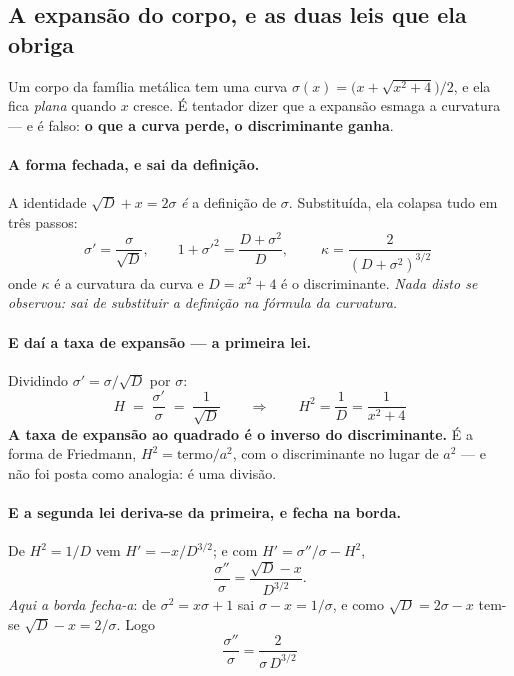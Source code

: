 \documentclass[livro.tex]{subfiles}
\begin{document}


\subsection{A expansão do corpo, e as duas leis que ela obriga}\label{sec:expansao}

\noindent Um corpo da família metálica tem uma curva $\sigma(x)=\bigl(x+\sqrt{x^2+4}\bigr)/2$, e ela
fica \emph{plana} quando $x$ cresce. É tentador dizer que a expansão esmaga a curvatura --- e é
falso: \textbf{o que a curva perde, o discriminante ganha}.

\paragraph{A forma fechada, e sai da definição.} A identidade $\sqrt{D}+x=2\sigma$ \emph{é} a
definição de $\sigma$. Substituída, ela colapsa tudo em três passos:
\[
  \sigma'=\frac{\sigma}{\sqrt{D}}, \qquad 1+\sigma'^2=\frac{D+\sigma^2}{D}, \qquad
  \boxed{\;\kappa=\frac{2}{(D+\sigma^2)^{3/2}}\;}
\]
onde $\kappa$ é a curvatura da curva e $D=x^2+4$ é o discriminante. \emph{Nada disto se observou:
sai de substituir a definição na fórmula da curvatura.}

\paragraph{E daí a taxa de expansão --- a primeira lei.} Dividindo $\sigma'=\sigma/\sqrt{D}$ por
$\sigma$:
\[
  \boxed{\;H \;=\; \frac{\sigma'}{\sigma} \;=\; \frac{1}{\sqrt{D}}
  \qquad\Longrightarrow\qquad H^2=\frac{1}{D}=\frac{1}{x^2+4}\;}
\]
\textbf{A taxa de expansão ao quadrado é o inverso do discriminante.} É a forma de Friedmann,
$H^2 = \text{termo}/a^2$, com o discriminante no lugar de $a^2$ --- e não foi posta como analogia:
é uma divisão.

\paragraph{E a segunda lei deriva-se da primeira, e fecha na borda.} De $H^2=1/D$ vem
$H'=-x/D^{3/2}$; e com $H'=\sigma''/\sigma-H^2$,
\[
  \frac{\sigma''}{\sigma}=\frac{\sqrt{D}-x}{D^{3/2}} .
\]
\emph{Aqui a borda fecha-a}: de $\sigma^2=x\sigma+1$ sai $\sigma-x=1/\sigma$, e como
$\sqrt{D}=2\sigma-x$ tem-se $\sqrt{D}-x=2/\sigma$. Logo
\[
  \boxed{\;\frac{\sigma''}{\sigma}=\frac{2}{\sigma\,D^{3/2}}\;}
\]
\end{document}
